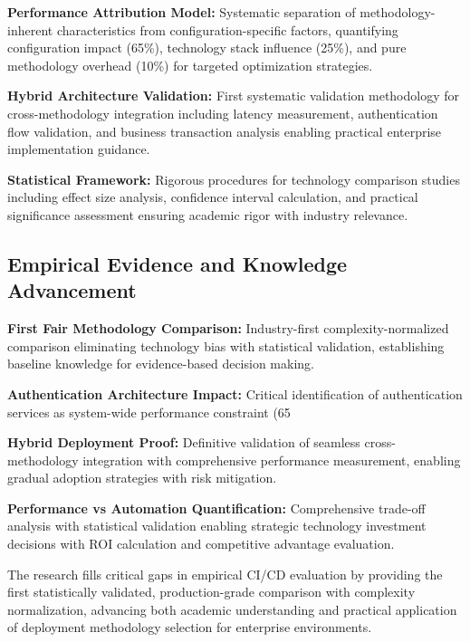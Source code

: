\textbf{Performance Attribution Model:} Systematic separation of methodology-inherent characteristics from configuration-specific factors, quantifying configuration impact (65\%), technology stack influence (25\%), and pure methodology overhead (10\%) for targeted optimization strategies.

\textbf{Hybrid Architecture Validation:} First systematic validation methodology for cross-methodology integration including latency measurement, authentication flow validation, and business transaction analysis enabling practical enterprise implementation guidance.

\textbf{Statistical Framework:} Rigorous procedures for technology comparison studies including effect size analysis, confidence interval calculation, and practical significance assessment ensuring academic rigor with industry relevance.

\subsection{Empirical Evidence and Knowledge Advancement}
\label{subsec:empirical_evidence}

\textbf{First Fair Methodology Comparison:} Industry-first complexity-normalized comparison eliminating technology bias with statistical validation, establishing baseline knowledge for evidence-based decision making.

\textbf{Authentication Architecture Impact:} Critical identification of authentication services as system-wide performance constraint (65%

\textbf{Hybrid Deployment Proof:} Definitive validation of seamless cross-methodology integration with comprehensive performance measurement, enabling gradual adoption strategies with risk mitigation.

\textbf{Performance vs Automation Quantification:} Comprehensive trade-off analysis with statistical validation enabling strategic technology investment decisions with ROI calculation and competitive advantage evaluation.

The research fills critical gaps in empirical CI/CD evaluation by providing the first statistically validated, production-grade comparison with complexity normalization, advancing both academic understanding and practical application of deployment methodology selection for enterprise environments.